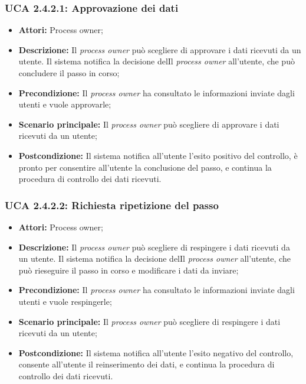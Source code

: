 \hypertarget{A2.4.2.1}{}
\subsubsection{UCA 2.4.2.1: Approvazione dei dati}
\begin{itemize}
\item \textbf{Attori:} Process owner;
\item \textbf{Descrizione:}
Il \textit{process owner} può scegliere di approvare i dati ricevuti da un utente. Il sistema notifica la decisione delIl \textit{process owner} all'utente, che può concludere il passo in corso;
\item \textbf{Precondizione:}
Il \textit{process owner} ha consultato le informazioni inviate dagli utenti e vuole approvarle;
\item \textbf{Scenario principale:}
Il \textit{process owner} può scegliere di approvare i dati ricevuti da un utente;
\item \textbf{Postcondizione:}
Il sistema notifica all'utente l'esito positivo del controllo, è pronto per consentire all'utente la conclusione del passo, e continua la procedura di controllo dei dati ricevuti.
\end{itemize}

\hypertarget{A2.4.2.2}{}
\subsubsection{UCA 2.4.2.2: Richiesta ripetizione del passo}
\begin{itemize}
\item \textbf{Attori:} Process owner;
\item \textbf{Descrizione:}
Il \textit{process owner} può scegliere di respingere i dati ricevuti da un utente. Il sistema notifica la decisione delIl \textit{process owner} all'utente, che può rieseguire il passo in corso e modificare i dati da inviare;
\item \textbf{Precondizione:}
Il \textit{process owner} ha consultato le informazioni inviate dagli utenti e vuole respingerle;
\item \textbf{Scenario principale:}
Il \textit{process owner} può scegliere di respingere i dati ricevuti da un utente;
\item \textbf{Postcondizione:}
Il sistema notifica all'utente l'esito negativo del controllo, consente all'utente il reinserimento dei dati, e continua la procedura di controllo dei dati ricevuti.
\end{itemize}

